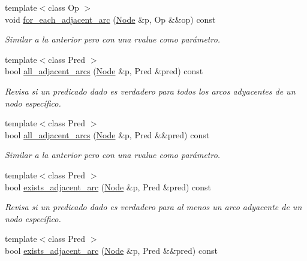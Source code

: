 \begin{DoxyCompactItemize}
{\footnotesize template$<$class Op $>$ }\\void \hyperlink{class_designar_1_1_base_graph_a21553c1d96334e4cf2e0e2086e0efeba}{for\+\_\+each\+\_\+adjacent\+\_\+arc} (\hyperlink{namespace_designar_a5af326c65aa2bd26b26c410f2030d09e}{Node} \&p, Op \&\&op) const
\begin{DoxyCompactList}\small\item\em Similar a la anterior pero con una rvalue como parámetro. \end{DoxyCompactList}\item 
{\footnotesize template$<$class Pred $>$ }\\bool \hyperlink{class_designar_1_1_base_graph_af7a57a1088105a79466546620bf830b3}{all\+\_\+adjacent\+\_\+arcs} (\hyperlink{namespace_designar_a5af326c65aa2bd26b26c410f2030d09e}{Node} \&p, Pred \&pred) const
\begin{DoxyCompactList}\small\item\em Revisa si un predicado dado es verdadero para todos los arcos adyacentes de un nodo específico. \end{DoxyCompactList}\item 
{\footnotesize template$<$class Pred $>$ }\\bool \hyperlink{class_designar_1_1_base_graph_aaae4400215b8ea6b55941875981c3892}{all\+\_\+adjacent\+\_\+arcs} (\hyperlink{namespace_designar_a5af326c65aa2bd26b26c410f2030d09e}{Node} \&p, Pred \&\&pred) const
\begin{DoxyCompactList}\small\item\em Similar a la anterior pero con una rvalue como parámetro. \end{DoxyCompactList}\item 
{\footnotesize template$<$class Pred $>$ }\\bool \hyperlink{class_designar_1_1_base_graph_a5208fcd131d919271e1d54f6e45ab3e9}{exists\+\_\+adjacent\+\_\+arc} (\hyperlink{namespace_designar_a5af326c65aa2bd26b26c410f2030d09e}{Node} \&p, Pred \&pred) const
\begin{DoxyCompactList}\small\item\em Revisa si un predicado dado es verdadero para al menos un arco adyacente de un nodo específico. \end{DoxyCompactList}\item 
{\footnotesize template$<$class Pred $>$ }\\bool \hyperlink{class_designar_1_1_base_graph_a16d3fbb089265c1dc8da8ffbe2fb1434}{exists\+\_\+adjacent\+\_\+arc} (\hyperlink{namespace_designar_a5af326c65aa2bd26b26c410f2030d09e}{Node} \&p, Pred \&\&pred) const

\end{DoxyCompactItemize}
